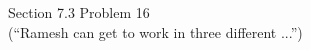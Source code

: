 \documentclass[11pt]{exam}
\begin{document}
\begin{questions}
\begin{solution}
\end{solution}
\question[4] Section 7.3 Problem 16\\
(“Ramesh can get to work in three different ...”) 
\begin{solution}\\



\end{solution}
\end{questions}
\end{document}
